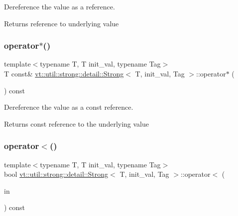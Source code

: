 Dereference the value as a reference. 

\begin{DoxyReturn}{Returns}
reference to underlying value 
\end{DoxyReturn}
\mbox{\label{structvt_1_1util_1_1strong_1_1detail_1_1_strong_a41a0ccceade5b4d7e2a3b67549ab142a}} 
\subsubsection{\texorpdfstring{operator$\ast$()}{operator*()}\hspace{0.1cm}{\footnotesize\ttfamily [2/2]}}
{\footnotesize\ttfamily template$<$typename T, T init\+\_\+val, typename Tag$>$ \\
T const\& \hyperlink{structvt_1_1util_1_1strong_1_1detail_1_1_strong}{vt\+::util\+::strong\+::detail\+::\+Strong}$<$ T, init\+\_\+val, Tag $>$\+::operator$\ast$ (\begin{DoxyParamCaption}{ }\end{DoxyParamCaption}) const\hspace{0.3cm}{\ttfamily [inline]}}



Dereference the value as a const reference. 

\begin{DoxyReturn}{Returns}
const reference to the underlying value 
\end{DoxyReturn}
\mbox{\label{structvt_1_1util_1_1strong_1_1detail_1_1_strong_a8f82e9a4d971a1b80b84234661a6ca58}} 
\subsubsection{\texorpdfstring{operator$<$()}{operator<()}}
{\footnotesize\ttfamily template$<$typename T, T init\+\_\+val, typename Tag$>$ \\
bool \hyperlink{structvt_1_1util_1_1strong_1_1detail_1_1_strong}{vt\+::util\+::strong\+::detail\+::\+Strong}$<$ T, init\+\_\+val, Tag $>$\+::operator$<$ (\begin{DoxyParamCaption}\item[{\hyperlink{structvt_1_1util_1_1strong_1_1detail_1_1_strong_a510d40741bda362d97a4753919a577dd}{This\+Type} const \&}]{in }\end{DoxyParamCaption}) const\hspace{0.3cm}{\ttfamily [inline]}}



